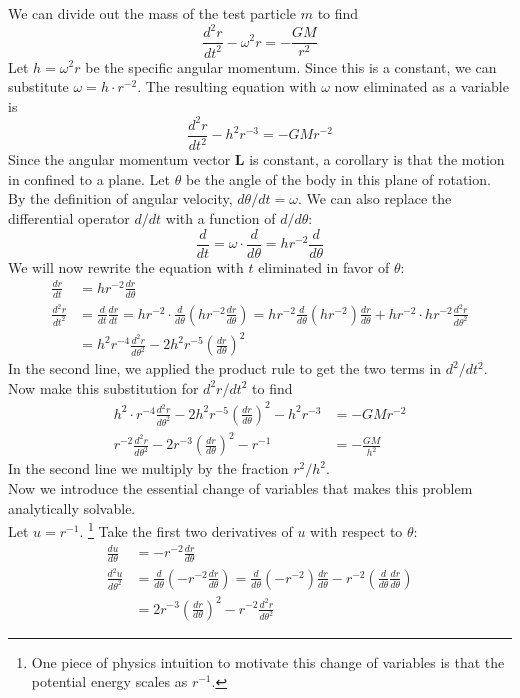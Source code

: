 We can divide out the mass of the test particle $m$ to find
$$ \frac{d^2r}{dt^2} - \omega^2 r = - \frac{G M }{r^2}$$
Let $h = \omega^2 r$ be the specific angular momentum.
Since this is a constant, we can substitute $\omega = h\cdot r^{-2}$.  
The resulting equation with $\omega$ now eliminated as a variable is
$$ \frac{d^2r}{dt^2} - h^2 r^{-3} = - G Mr^{-2}$$
Since the angular momentum vector $\mathbf{L}$ is constant, a corollary is that the motion in confined to a plane.
Let $\theta$ be the angle of the body in this plane of rotation.
By the definition of angular velocity, $d\theta / dt = \omega$.
We can also replace the differential operator $d / dt$ with a function of $d / d\theta$:
$$\frac{d}{dt} = \omega \cdot \frac{d}{d\theta} = h r^{-2} \frac{d}{d\theta}$$
We will now rewrite the equation with $t$ eliminated in favor of $\theta$:
\begin{align*}
\frac{dr}{dt} &= hr^{-2} \frac{dr}{d\theta} \\
\frac{d^2r}{dt^2} &= \frac{d}{dt} \frac{dr}{dt} = hr^{-2} \cdot \frac{d}{d\theta} \left( hr^{-2} \frac{dr}{d\theta} \right)
= hr^{-2} \frac{d}{d\theta} \left(hr^{-2}\right) \frac{dr}{d\theta}  + hr^{-2} \cdot hr^{-2} \frac{d^2r}{d\theta^2} \\
&= h^2 r^{-4} \frac{d^2r}{d\theta^2} - 2h^2 r^{-5} \left( \frac{dr}{d\theta} \right)^2
\end{align*}
In the second line, we applied the product rule to get the two terms in $d^2 / dt^2$.\\
Now make this substitution for $d^2r/ dt^2$ to find
\begin{align*}
h^2 \cdot r^{-4} \frac{d^2r}{d\theta^2} - 2h^2 r^{-5} \left(\frac{dr}{d\theta}\right)^2 - h^2r^{-3} &= -GMr^{-2} \\
r^{-2} \frac{d^2r}{d\theta^2} - 2 r^{-3} \left(\frac{dr}{d\theta}\right)^2 - r^{-1} &= -\frac{GM}{h^2}
\end{align*}
In the second line we multiply by the fraction $r^2 / h^2$.\\
Now we introduce the essential change of variables that makes this problem analytically solvable.\\
Let $u = r^{-1}$.  
\footnote{One piece of physics intuition to motivate this change of variables is that the potential energy scales as $r^{-1}$.}
Take the first two derivatives of $u$ with respect to $\theta$:
\begin{align*}
\frac{du}{d\theta} &= -r^{-2} \frac{dr}{d\theta} \\
\frac{d^2u}{d\theta^2} &= \frac{d}{d\theta} \left( -r^{-2} \frac{dr}{d\theta} \right) = 
\frac{d}{d\theta} \left( -r^{-2} \right)\frac{dr}{d\theta} -r^{-2} \left( \frac{d}{d\theta}   \frac{dr}{d\theta} \right) \\
&= 2r^{-3} \left(\frac{dr}{d\theta}\right)^{2} - r^{-2} \frac{d^2r}{d\theta^2}
\end{align*}
